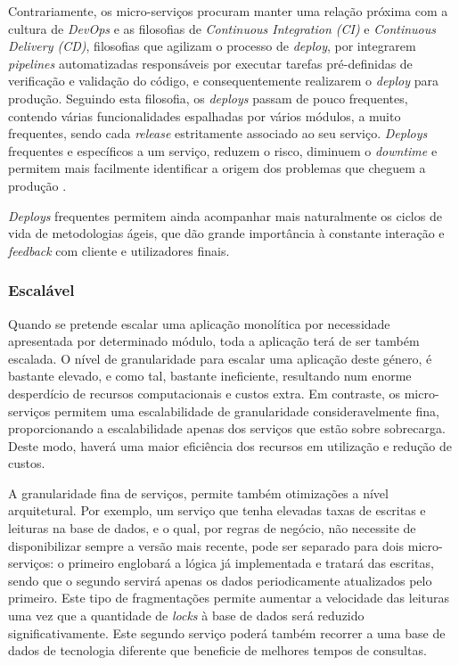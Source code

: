         Contrariamente, os micro-serviços procuram manter uma relação próxima com a cultura de \textit{DevOps} e as filosofias de \textit{Continuous Integration (CI)} e \textit{Continuous Delivery (CD)}, filosofias que agilizam o processo de \textit{deploy}, por integrarem \textit{pipelines} automatizadas responsáveis por executar tarefas pré-definidas de verificação e validação do código, e consequentemente realizarem o \textit{deploy} para produção. Seguindo esta filosofia, os \textit{deploys} passam de pouco frequentes, contendo várias funcionalidades espalhadas por vários módulos, a muito frequentes, sendo cada \textit{release} estritamente associado ao seu serviço. \textit{Deploys} frequentes e específicos a um serviço, reduzem o risco, diminuem o \textit{downtime} e permitem mais facilmente identificar a origem dos problemas que cheguem a produção \citep{newman2015microservices}.
    
        \textit{Deploys} frequentes permitem ainda acompanhar mais naturalmente os ciclos de vida de metodologias ágeis, que dão grande importância à constante interação e \textit{feedback} com cliente e utilizadores finais. 
    
    
    \subsubsection*{Escalável}
       
       Quando se pretende escalar uma aplicação monolítica por necessidade apresentada por determinado módulo, toda a aplicação terá de ser também escalada. O nível de granularidade para escalar uma aplicação deste género, é bastante elevado, e como tal, bastante ineficiente, resultando num enorme desperdício de recursos computacionais e custos extra. Em contraste, os micro-serviços permitem uma escalabilidade de granularidade consideravelmente fina, proporcionando a escalabilidade apenas dos serviços que estão sobre sobrecarga. Deste modo, haverá uma maior eficiência dos recursos em utilização e redução de custos.
       
       A granularidade fina de serviços, permite também otimizações a nível arquitetural. Por exemplo, um serviço que tenha elevadas taxas de escritas e leituras na base de dados, e o qual, por regras de negócio, não necessite de disponibilizar sempre a versão mais recente, pode ser separado para dois micro-serviços: o primeiro englobará a lógica já implementada e tratará das escritas, sendo que o segundo servirá apenas os dados periodicamente atualizados pelo primeiro. Este tipo de fragmentações permite aumentar a velocidade das leituras uma vez que a quantidade de \textit{locks} à base de dados será reduzido significativamente. Este segundo serviço poderá também recorrer a uma base de dados de tecnologia diferente que beneficie de melhores tempos de consultas.
       
